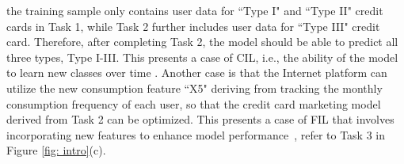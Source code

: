 the training sample only contains user data for ``Type I" and ``Type II" credit cards in Task 1, while Task 2 further includes user data for ``Type III" credit card. 
Therefore, after completing Task 2, the model should be able to predict all three types, Type I-III.
This presents a case of 
CIL, i.e., the ability of the model to learn new classes over time \cite{lebichot2024assessment,ma2022continual,casado2023ensemble}.
Another case is that the Internet platform can utilize the new consumption feature ``X5" deriving from tracking the monthly consumption frequency of each user, so that the credit card marketing model derived from Task 2 can be optimized. 
This presents a case of
FIL that involves incorporating new features to enhance model performance~\cite{ni2024feature}, refer to Task 3 in Figure \ref{fig: intro}(c). 












